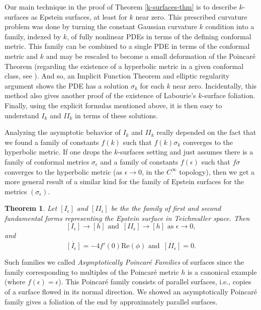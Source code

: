 \documentclass[11pt]{amsart}
\newtheorem{thm}{Theorem}[section]
\begin{document}
Our main technique in the proof of Theorem \ref{k-surfaces-thm} is to describe $k$-surfaces as Epstein surfaces, at least for $k$ near zero. 
This prescribed curvature problem was done by turning the constant Gaussian curvature $k$ condition into a family, indexed by $k$, of fully nonlinear PDEs in terms of the defining conformal metric. 
This family can be combined to a single PDE in terms of the conformal metric and $k$ and may be rescaled to become a small deformation of the Poincar\'e Theorem (regarding the existence of a hyperbolic metric in a given conformal class, see \cite{tromba1992}). 
And so, an Implicit Function Theorem and elliptic regularity argument shows the PDE has a solution $\sigma_k$ for each $k$ near zero. 
Incidentally, this method also gives another proof of the existence of Labourie's $k$-surface foliation. 
Finally, using the explicit formulas mentioned above, it is then easy to understand $I_k$ and $I\!I_k$ in terms of these solutions. 


Analyzing the asymptotic behavior of $I_k$ and $I\!I_k$ really depended on the fact that we found a family of constants $f(k)$ such that $f(k)\sigma_k$ converges to the hyperbolic metric. 
If one drops the $k$-surfaces setting and just assumes there is a family of conformal metrics $\sigma_\epsilon$ and a family of constants $f(\epsilon)$ such that $f\sigma$ converges to the hyperbolic metric (as $\epsilon \to 0$, in the $C^\infty$ topology), then we get a more general result of a similar kind for the family of Epstein surfaces for the metrics $(\sigma_\epsilon)$. 

\begin{thm}
\label{asym-poincare-thm}
Let $[I_\epsilon]$ and $[I\!I_\epsilon]$ be the the family of first and second fundamental forms representing the Epstein surface in Teichmuller space. 
Then
\[
[I_\epsilon] \to  [h]  \text{ and } \, [I\!I_\epsilon] \to [h]  \text{ as } \epsilon \to 0,
\]
and
\[
\dot{[I_\epsilon]} = -4 f'(0) \mathrm{Re}(\phi) \text{ and } \, \dot{[I\!I_\epsilon]} = 0. 
\]
\end{thm}

Such families we called \emph{Asymptotically Poincar\'e Families} of surfaces since the family corresponding to multiples of the Poincar\'e metric $h$ is a canonical example (where $f(\epsilon) = \epsilon$). 
This Poincar\'e family consists of parallel surfaces, i.e., copies of a surface flowed in its normal direction. 
We showed an asymptotically Poincar\'e family gives a foliation of the end by approximately parallel surfaces.
\end{document}
